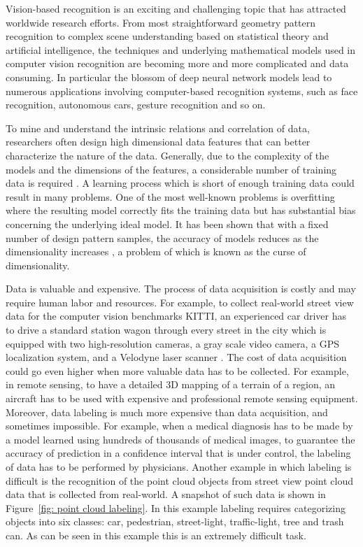 \documentclass{iitthesis}
\begin{document}
Vision-based recognition is an exciting and challenging topic that has attracted worldwide research efforts. From most straightforward geometry pattern recognition to complex scene understanding based on statistical theory and artificial intelligence, the techniques and underlying mathematical models used in computer vision recognition are becoming more and more complicated and data consuming. In particular the blossom of deep neural network models \cite{HK:89, HG:06, LY:98, LH:09} lead to numerous applications involving computer-based recognition systems, such as face recognition, autonomous cars, gesture recognition and so on.

To mine and understand the intrinsic relations and correlation of data, researchers often design high dimensional data features that can better characterize the nature of the data. Generally, due to the complexity of the models and the dimensions of the features, a considerable number of training data is required \cite{RS:91, KHM:83}. A learning process which is short of enough training data could result in many problems. One of the most well-known problems is overfitting where the resulting model correctly fits the training data but has substantial bias concerning the underlying ideal model. It has been shown that with a fixed number of design pattern samples, the accuracy of models reduces as the dimensionality increases \cite{HG:68}, a problem of which is known as the curse of dimensionality.

Data is valuable and expensive. The process of data acquisition is costly and may require human labor and resources. For example, to collect real-world street view data for the computer vision benchmarks KITTI, an experienced car driver has to drive a standard station wagon through every street in the city which is equipped with two high-resolution cameras, a gray scale video camera, a GPS localization system, and a Velodyne laser scanner \cite{AG:12}. The cost of data acquisition could go even higher when more valuable data has to be collected. For example, in remote sensing, to have a detailed 3D mapping of a terrain of a region, an aircraft has to be used with expensive and professional remote sensing equipment. Moreover, data labeling is much more expensive than data acquisition, and sometimes impossible. For example, when a medical diagnosis has to be made by a model learned using hundreds of thousands of medical images, to guarantee the accuracy of prediction in a confidence interval that is under control, the labeling of data has to be performed by physicians. Another example in which labeling is difficult is the recognition of the point cloud objects from street view point cloud data that is collected from real-world. A snapshot of such data is shown in Figure~\ref{fig: point cloud labeling}. In this example labeling requires categorizing objects into six classes: car, pedestrian, street-light, traffic-light, tree and trash can. As can be seen in this example this is an extremely difficult task.
\end{document}
